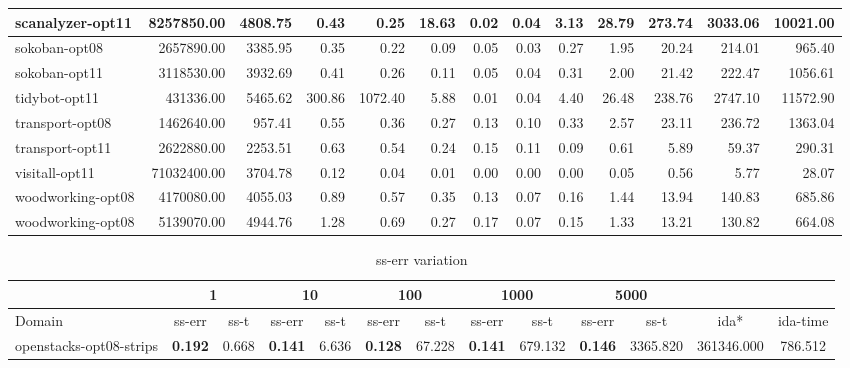 \documentclass[a4paper,12pt]{article}
\begin{document}
\begin{table}[]
\begin{tabular}{l@{\hspace{6pt}} *{12}{|r}}
scanalyzer-opt11 & 8257850.00& 4808.75& 0.43& 0.25& 18.63& 0.02& 0.04& 3.13& 28.79& 273.74& 3033.06& 10021.00\\ \hline
sokoban-opt08 & 2657890.00& 3385.95& 0.35& 0.22& 0.09& 0.05& 0.03& 0.27& 1.95& 20.24& 214.01& 965.40\\ \hline
sokoban-opt11 & 3118530.00& 3932.69& 0.41& 0.26& 0.11& 0.05& 0.04& 0.31& 2.00& 21.42& 222.47& 1056.61\\ \hline
tidybot-opt11 & 431336.00& 5465.62& 300.86& 1072.40& 5.88& 0.01& 0.04& 4.40& 26.48& 238.76& 2747.10& 11572.90\\ \hline
transport-opt08 & 1462640.00& 957.41& 0.55& 0.36& 0.27& 0.13& 0.10& 0.33& 2.57& 23.11& 236.72& 1363.04\\ \hline
transport-opt11 & 2622880.00& 2253.51& 0.63& 0.54& 0.24& 0.15& 0.11& 0.09& 0.61& 5.89& 59.37& 290.31\\ \hline
visitall-opt11 & 71032400.00& 3704.78& 0.12& 0.04& 0.01& 0.00& 0.00& 0.00& 0.05& 0.56& 5.77& 28.07\\ \hline
woodworking-opt08 & 4170080.00& 4055.03& 0.89& 0.57& 0.35& 0.13& 0.07& 0.16& 1.44& 13.94& 140.83& 685.86\\ \hline
woodworking-opt08 & 5139070.00& 4944.76& 1.28& 0.69& 0.27& 0.17& 0.07& 0.15& 1.33& 13.21& 130.82& 664.08\\ \hline
\end{tabular}
\end{table}



\iffalse

\begin{table}[]
\footnotesize\setlength{\tabcolsep}{2.0pt}
\caption{ss-err variation}
\label{subTable1}
\begin{tabular}{l@{\hspace{6pt}} *{12}{c}}
\hline
                        & \multicolumn{2}{c|}{1} & \multicolumn{2}{c|}{10} & \multicolumn{2}{c|}{100} & \multicolumn{2}{c|}{1000} & \multicolumn{2}{c|}{5000} &            &          \\ \hline
Domain                  & ss-err        & ss-t   & ss-err        & ss-t    & ss-err        & ss-t     & ss-err        & ss-t      & ss-err        & ss-t      & ida*       & ida-time \\ \hline
openstacks-opt08-strips & {\bf 0.192}   & 0.668  & {\bf 0.141}   & 6.636   & {\bf 0.128}   & 67.228   & {\bf 0.141}   & 679.132   & {\bf 0.146}   & 3365.820  & 361346.000 & 786.512  \\ \hline
\end{tabular}
\end{table}
\end{document}
